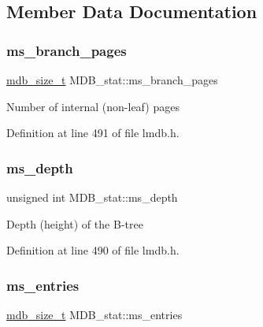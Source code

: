 \subsection{Member Data Documentation}
\mbox{\label{struct_m_d_b__stat_a7aa982a4930af52421cd698852f39cd8}} 
\subsubsection{\texorpdfstring{ms\+\_\+branch\+\_\+pages}{ms\_branch\_pages}}
{\footnotesize\ttfamily \mbox{\hyperlink{lmdb_8h_a78821971e612e3898ef4b3ae45ed86f1}{mdb\+\_\+size\+\_\+t}} M\+D\+B\+\_\+stat\+::ms\+\_\+branch\+\_\+pages}

Number of internal (non-\/leaf) pages 

Definition at line 491 of file lmdb.\+h.

\mbox{\label{struct_m_d_b__stat_ab4e70f35499a7e7c71429b04ac62de68}} 
\subsubsection{\texorpdfstring{ms\+\_\+depth}{ms\_depth}}
{\footnotesize\ttfamily unsigned int M\+D\+B\+\_\+stat\+::ms\+\_\+depth}

Depth (height) of the B-\/tree 

Definition at line 490 of file lmdb.\+h.

\mbox{\label{struct_m_d_b__stat_a28bb7e00d1098ccfd44a10eca4aa8403}} 
\subsubsection{\texorpdfstring{ms\+\_\+entries}{ms\_entries}}
{\footnotesize\ttfamily \mbox{\hyperlink{lmdb_8h_a78821971e612e3898ef4b3ae45ed86f1}{mdb\+\_\+size\+\_\+t}} M\+D\+B\+\_\+stat\+::ms\+\_\+entries}

